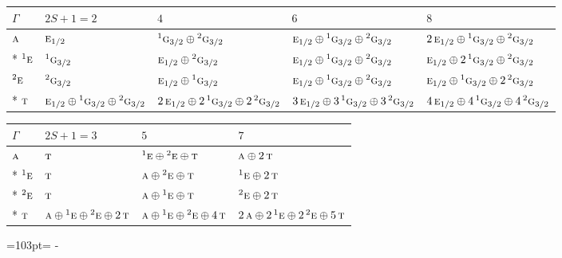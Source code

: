 \documentclass[10pt,a4paper]{article}
\newcommand{\needspace}[1]{\par\penalty-100\begingroup\dimen0=#1\relax\dimen2=\pagegoal
  \advance\dimen2-\pagetotal\ifdim\dimen0>\dimen2\relax\ifdim\dimen2>0pt\vfil\break\fi\fi
  \endgroup}
\numberwithin{equation}{section}
\newcommand{\irr}[1]{\text{\normalfont\scshape #1}}
\newcommand{\conjpair}[1]{{}^{#1}}
\begin{document}
{\small\setlength{\tabcolsep}{3pt}\begin{longtable}{@{}l>{\RaggedRight\arraybackslash}p{}>{\RaggedRight\arraybackslash}p{}>{\RaggedRight\arraybackslash}p{}>{\RaggedRight\arraybackslash}p{}@{}}\toprule
$\Gamma$ & $2S + 1 = 2$ & $4$ & $6$ & $8$\\\midrule\endhead
\bottomrule\endfoot\endlastfoot
$\irr{a}$ & $\irr{e}_{1/2}$ & $\conjpair{1}\irr{g}_{3/2}\oplus \conjpair{2}\irr{g}_{3/2}$ & $\irr{e}_{1/2}\oplus \conjpair{1}\irr{g}_{3/2}\oplus \conjpair{2}\irr{g}_{3/2}$ & $2\,\irr{e}_{1/2}\oplus \conjpair{1}\irr{g}_{3/2}\oplus \conjpair{2}\irr{g}_{3/2}$\\*
$\conjpair{1}\irr{e}$ & $\conjpair{1}\irr{g}_{3/2}$ & $\irr{e}_{1/2}\oplus \conjpair{2}\irr{g}_{3/2}$ & $\irr{e}_{1/2}\oplus \conjpair{1}\irr{g}_{3/2}\oplus \conjpair{2}\irr{g}_{3/2}$ & $\irr{e}_{1/2}\oplus 2\,\conjpair{1}\irr{g}_{3/2}\oplus \conjpair{2}\irr{g}_{3/2}$\\
$\conjpair{2}\irr{e}$ & $\conjpair{2}\irr{g}_{3/2}$ & $\irr{e}_{1/2}\oplus \conjpair{1}\irr{g}_{3/2}$ & $\irr{e}_{1/2}\oplus \conjpair{1}\irr{g}_{3/2}\oplus \conjpair{2}\irr{g}_{3/2}$ & $\irr{e}_{1/2}\oplus \conjpair{1}\irr{g}_{3/2}\oplus 2\,\conjpair{2}\irr{g}_{3/2}$\\*
$\irr{t}$ & $\irr{e}_{1/2}\oplus \conjpair{1}\irr{g}_{3/2}\oplus \conjpair{2}\irr{g}_{3/2}$ & $2\,\irr{e}_{1/2}\oplus 2\,\conjpair{1}\irr{g}_{3/2}\oplus 2\,\conjpair{2}\irr{g}_{3/2}$ & $3\,\irr{e}_{1/2}\oplus 3\,\conjpair{1}\irr{g}_{3/2}\oplus 3\,\conjpair{2}\irr{g}_{3/2}$ & $4\,\irr{e}_{1/2}\oplus 4\,\conjpair{1}\irr{g}_{3/2}\oplus 4\,\conjpair{2}\irr{g}_{3/2}$\\
\bottomrule\end{longtable}}
{\small\setlength{\tabcolsep}{3pt}\begin{longtable}{@{}llll@{}}\toprule
$\Gamma$ & $2S + 1 = 3$ & $5$ & $7$\\\midrule\endhead
\bottomrule\endfoot\endlastfoot
$\irr{a}$ & $\irr{t}$ & $\conjpair{1}\irr{e}\oplus \conjpair{2}\irr{e}\oplus \irr{t}$ & $\irr{a}\oplus 2\,\irr{t}$\\*
$\conjpair{1}\irr{e}$ & $\irr{t}$ & $\irr{a}\oplus \conjpair{2}\irr{e}\oplus \irr{t}$ & $\conjpair{1}\irr{e}\oplus 2\,\irr{t}$\\*
$\conjpair{2}\irr{e}$ & $\irr{t}$ & $\irr{a}\oplus \conjpair{1}\irr{e}\oplus \irr{t}$ & $\conjpair{2}\irr{e}\oplus 2\,\irr{t}$\\*
$\irr{t}$ & $\irr{a}\oplus \conjpair{1}\irr{e}\oplus \conjpair{2}\irr{e}\oplus 2\,\irr{t}$ & $\irr{a}\oplus \conjpair{1}\irr{e}\oplus \conjpair{2}\irr{e}\oplus 4\,\irr{t}$ & $2\,\irr{a}\oplus 2\,\conjpair{1}\irr{e}\oplus 2\,\conjpair{2}\irr{e}\oplus 5\,\irr{t}$\\
\bottomrule\end{longtable}}
\needspace{103pt}
\end{document}
